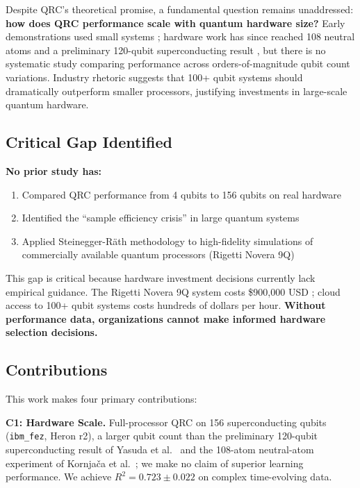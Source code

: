 \documentclass[conference]{IEEEtran}
\begin{document}
Despite QRC's theoretical promise, a fundamental question remains unaddressed: \textbf{how does QRC performance scale with quantum hardware size?} Early demonstrations used small systems \cite{negoro2018machine, fujii2017harnessing}; hardware work has since reached 108 neutral atoms \cite{kornjaca2024largescale} and a preliminary 120-qubit superconducting result \cite{yasuda2023quantum}, but there is no systematic study comparing performance across orders-of-magnitude qubit count variations. Industry rhetoric suggests that 100+ qubit systems should dramatically outperform smaller processors, justifying investments in large-scale quantum hardware.

\subsection{Critical Gap Identified}

\textbf{No prior study has:}
\begin{enumerate}
    \item Compared QRC performance from 4 qubits to 156 qubits on real hardware
    \item Identified the ``sample efficiency crisis'' in large quantum systems
    \item Applied Steinegger-Räth methodology \cite{steinegger2025quantum} to high-fidelity simulations of commercially available quantum processors (Rigetti Novera 9Q)
\end{enumerate}

This gap is critical because hardware investment decisions currently lack empirical guidance. The Rigetti Novera 9Q system costs \$900,000 USD \cite{rigetti2024novera}; cloud access to 100+ qubit systems costs hundreds of dollars per hour. \textbf{Without performance data, organizations cannot make informed hardware selection decisions.}

\subsection{Contributions}

This work makes four primary contributions:

\textbf{C1: Hardware Scale.} Full-processor QRC on 156 superconducting qubits (\texttt{ibm\_fez}, Heron r2), a larger qubit count than the preliminary 120-qubit superconducting result of Yasuda et al.~\cite{yasuda2023quantum} and the 108-atom neutral-atom experiment of Kornja\v{c}a et al.~\cite{kornjaca2024largescale}; we make no claim of superior learning performance. We achieve $R^2=0.723 \pm 0.022$ on complex time-evolving data.
\end{document}
